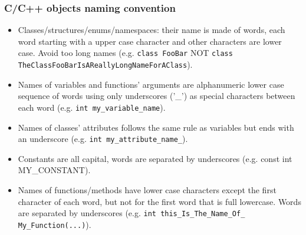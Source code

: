 \documentclass[12pt,a4paper]{article}
\begin{document}
\subsubsection{C/C++ objects naming convention}
\begin{itemize}
\item Classes/structures/enums/namespaces: their name is made of words, each word starting with a upper case character and other characters are lower case. Avoid too long names (e.g. \texttt{class FooBar} NOT \texttt{class TheClassFooBarIsAReallyLongNameForAClass}).
\item Names  of variables and functions' arguments are alphanumeric lower case sequence of words using only underscores ('\_') as special characters between each word (e.g. \texttt{int my\_variable\_name}).
\item Names of classes' attributes follows the same rule as variables but ends with an underscore (e.g. \texttt{int my\_attribute\_name\_}).
\item Constants are all capital, words are separated by underscores (e.g. const int MY\_CONSTANT).
\item Names of functions/methods have lower case characters except the first character of each word, but not for the first word that is full lowercase. Words are separated by underscores (e.g. \texttt{int this\_Is\_The\_Name\_Of\_ My\_Function(...)}).
\end{itemize}
\end{document}
